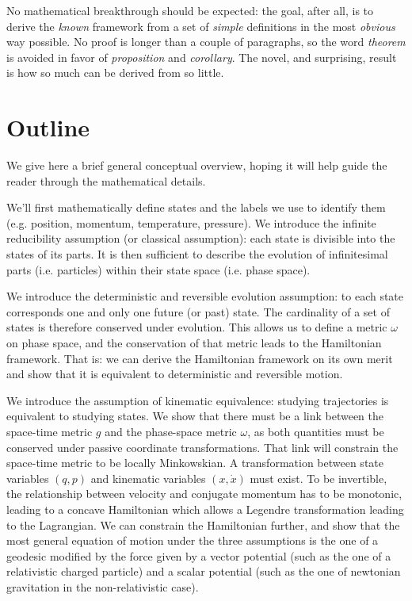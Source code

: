 \documentclass[aps,pra,10pt,twocolumn,floatfix,nofootinbib]{revtex4-1}
\theoremstyle{definition}
\begin{document}
No mathematical breakthrough should be expected: the goal, after all, is to derive the \emph{known} framework from a set of \emph{simple} definitions in the most \emph{obvious} way possible. No proof is longer than a couple of paragraphs, so the word \emph{theorem} is avoided in favor of \emph{proposition} and \emph{corollary}. The novel, and surprising, result is how so much can be derived from so little.

\section{Outline}

We give here a brief general conceptual overview, hoping it will help guide the reader through the mathematical details.

We'll first mathematically define states and the labels we use to identify them (e.g. position, momentum, temperature, pressure). We introduce the infinite reducibility assumption (or classical assumption): each state is divisible into the states of its parts. It is then sufficient to describe the evolution of infinitesimal parts (i.e. particles) within their state space (i.e. phase space).

We introduce the deterministic and reversible evolution assumption: to each state corresponds one and only one future (or past) state. The cardinality of a set of states is therefore conserved under evolution. This allows us to define a metric $\omega$ on phase space, and the conservation of that metric leads to the Hamiltonian framework. That is: we can derive the Hamiltonian framework on its own merit and show that it is equivalent to deterministic and reversible motion.

We introduce the assumption of kinematic equivalence: studying trajectories is equivalent to studying states. We show that there must be a link between the space-time metric $g$ and the phase-space metric $\omega$, as both quantities must be conserved under passive coordinate transformations. That link will constrain the space-time metric to be locally Minkowskian. A transformation between state variables $(q, p)$ and kinematic variables $(x, \dot{x})$ must exist.  To be invertible, the relationship between velocity and conjugate momentum has to be monotonic, leading to a concave Hamiltonian which allows a Legendre transformation leading to the Lagrangian. We can constrain the Hamiltonian further, and show that the most general equation of motion under the three assumptions is the one of a geodesic modified by the force given by a vector potential (such as the one of a relativistic charged particle) and a scalar potential (such as the one of newtonian gravitation in the non-relativistic case).
\end{document}
